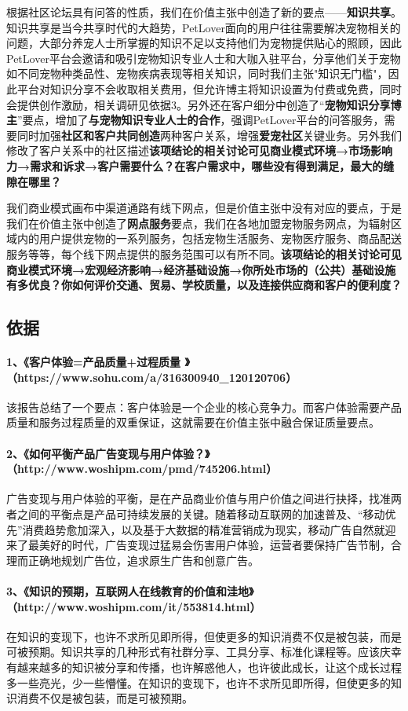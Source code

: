 \documentclass[a4paper]{ctexart}
\begin{document}
根据社区论坛具有问答的性质，我们在价值主张中创造了新的要点——\textbf{知识共享}。知识共享是当今共享时代的大趋势，PetLover面向的用户往往需要解决宠物相关的问题，大部分养宠人士所掌握的知识不足以支持他们为宠物提供贴心的照顾，因此PetLover平台会邀请和吸引宠物知识专业人士和大咖入驻平台，分享他们关于宠物如不同宠物种类品性、宠物疾病表现等相关知识，同时我们主张"知识无门槛"，因此平台对知识分享不会收取相关费用，但允许博主将知识设置为付费或免费，同时会提供创作激励，相关调研见依据3。另外还在客户细分中创造了“\textbf{宠物知识分享博主}”要点，增加了\textbf{与宠物知识专业人士的合作}，强调PetLover平台的问答服务，需要同时加强\textbf{社区和客户共同创造}两种客户关系，增强\textbf{爱宠社区}关键业务。另外我们修改了客户关系中的社区描述\textbf{该项结论的相关讨论可见商业模式环境→市场影响力→需求和诉求→客户需要什么？在客户需求中，哪些没有得到满足，最大的缝隙在哪里？}

我们商业模式画布中渠道通路有线下网点，但是价值主张中没有对应的要点，于是我们在价值主张中创造了\textbf{网点服务}要点，我们在各地加盟宠物服务网点，为辐射区域内的用户提供宠物的一系列服务，包括宠物生活服务、宠物医疗服务、商品配送服务等等，每个线下网点提供的服务范围可以有所不同。\textbf{该项结论的相关讨论可见商业模式环境→宏观经济影响→经济基础设施→你所处市场的（公共）基础设施有多优良？你如何评价交通、贸易、学校质量，以及连接供应商和客户的便利度？}

\subsection{依据}
\paragraph{1、《客户体验=产品质量+过程质量 》（https://www.sohu.com/a/316300940\_120120706）}该报告总结了一个要点：客户体验是一个企业的核心竞争力。而客户体验需要产品质量和服务过程质量的双重保证，这就需要在价值主张中融合保证质量要点。
\paragraph{2、《如何平衡产品广告变现与用户体验？》（http://www.woshipm.com/pmd/745206.html）}广告变现与用户体验的平衡，是在产品商业价值与用户价值之间进行抉择，找准两者之间的平衡点是产品可持续发展的关键。随着移动互联网的加速普及、“移动优先”消费趋势愈加深入，以及基于大数据的精准营销成为现实，移动广告自然就迎来了最美好的时代，广告变现过猛易会伤害用户体验，运营者要保持广告节制，合理而正确地规划广告位，追求原生广告和创意广告。
\paragraph{3、《知识的预期，互联网人在线教育的价值和洼地》（http://www.woshipm.com/it/553814.html）}在知识的变现下，也许不求所见即所得，但使更多的知识消费不仅是被包装，而是可被预期。知识共享的几种形式有社群分享、工具分享、标准化课程等。应该庆幸有越来越多的知识被分享和传播，也许解惑他人，也许彼此成长，让这个成长过程多一些亮光，少一些懵懂。在知识的变现下，也许不求所见即所得，但使更多的知识消费不仅是被包装，而是可被预期。
\end{document}
